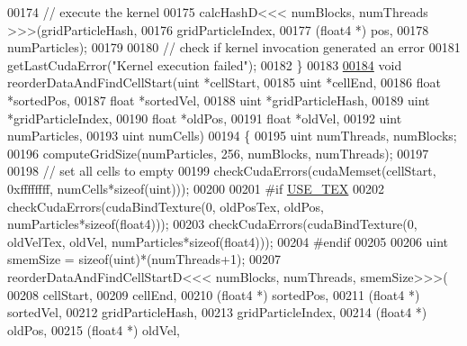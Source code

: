 \begin{DoxyCode}
00174         \textcolor{comment}{// execute the kernel}
00175         calcHashD<<< numBlocks, numThreads >>>(gridParticleHash,
00176                                                gridParticleIndex,
00177                                                (float4 *) pos,
00178                                                numParticles);
00179 
00180         \textcolor{comment}{// check if kernel invocation generated an error}
00181         getLastCudaError(\textcolor{stringliteral}{"Kernel execution failed"});
00182     \}
00183 
\hypertarget{particle_system__cuda_8cu_source_l00184}{}\hyperlink{particle_system__cuda_8cu_ac72ccd068434c46c2f901c751d53be1d}{00184}     \textcolor{keywordtype}{void} reorderDataAndFindCellStart(uint  *cellStart,
00185                                      uint  *cellEnd,
00186                                      \textcolor{keywordtype}{float} *sortedPos,
00187                                      \textcolor{keywordtype}{float} *sortedVel,
00188                                      uint  *gridParticleHash,
00189                                      uint  *gridParticleIndex,
00190                                      \textcolor{keywordtype}{float} *oldPos,
00191                                      \textcolor{keywordtype}{float} *oldVel,
00192                                      uint   numParticles,
00193                                      uint   numCells)
00194     \{
00195         uint numThreads, numBlocks;
00196         computeGridSize(numParticles, 256, numBlocks, numThreads);
00197 
00198         \textcolor{comment}{// set all cells to empty}
00199         checkCudaErrors(cudaMemset(cellStart, 0xffffffff, numCells*\textcolor{keyword}{sizeof}(uint)));
00200 
00201 \textcolor{preprocessor}{#}\textcolor{preprocessor}{if} \hyperlink{particles__kernel_8cuh_a0ab211ca35e2616c721fcf2dd4f99c83}{USE\_TEX}
00202         checkCudaErrors(cudaBindTexture(0, oldPosTex, oldPos, numParticles*\textcolor{keyword}{sizeof}(float4)));
00203         checkCudaErrors(cudaBindTexture(0, oldVelTex, oldVel, numParticles*\textcolor{keyword}{sizeof}(float4)));
00204 \textcolor{preprocessor}{#}\textcolor{preprocessor}{endif}
00205 
00206         uint smemSize = \textcolor{keyword}{sizeof}(uint)*(numThreads+1);
00207         reorderDataAndFindCellStartD<<< numBlocks, numThreads, smemSize>>>(
00208             cellStart,
00209             cellEnd,
00210             (float4 *) sortedPos,
00211             (float4 *) sortedVel,
00212             gridParticleHash,
00213             gridParticleIndex,
00214             (float4 *) oldPos,
00215             (float4 *) oldVel,

\end{DoxyCode}
